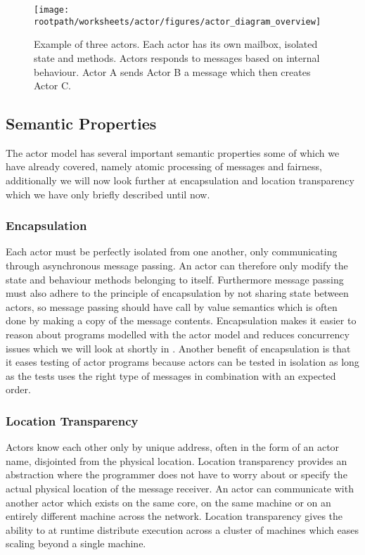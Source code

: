 \begin{figure}[h!]
\centering
\texttt{[image: \\rootpath/worksheets/actor/figures/actor\_diagram\_overview]}
\caption{Example of three actors. Each actor has its own mailbox, isolated state and methods. Actors responds to messages based on internal behaviour. Actor A sends Actor B a message which then creates Actor C.}\label{fig:actor_overview}
\end{figure}

\subsection{Semantic Properties}
The actor model has several important semantic properties some of which we have already covered, namely atomic processing of messages and fairness, additionally we will now look further at encapsulation and location transparency which we have only briefly described until now\cite{karmani2011actors}.

\subsubsection{Encapsulation}
Each actor must be perfectly isolated from one another, only communicating through asynchronous message passing. An actor can therefore only modify the state and behaviour methods belonging to itself. Furthermore message passing must also adhere to the principle of encapsulation by not sharing state between actors, so message passing should have call by value semantics which is often done by making a copy of the message contents\cite[p. 2]{karmani2009actor}. Encapsulation makes it easier to reason about programs modelled with the actor model\cite[p. 3]{karmani2009actor} and reduces concurrency issues which we will look at shortly in . Another benefit of encapsulation is that it eases testing of actor programs because actors can be tested in isolation as long as the tests uses the right type of messages in combination with an expected order\cite[p. 151]{sevenModels}.

\subsubsection{Location Transparency}
Actors know each other only by unique address, often in the form of an actor name, disjointed from the physical location. Location transparency provides an abstraction where the programmer does not have to worry about or specify the actual physical location of the message receiver. An actor can communicate with another actor which exists on the same core, on the same machine or on an entirely different machine across the network\cite[p. 3]{karmani2009actor}. Location transparency gives the ability to at runtime distribute execution across a cluster of machines which eases scaling beyond a single machine.


